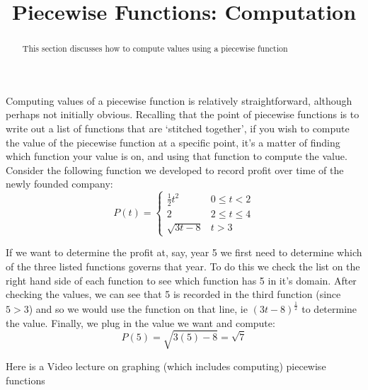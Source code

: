 \documentclass{ximera}
\title{Piecewise Functions: Computation}
\begin{document}
\begin{abstract}
    This section discusses how to compute values using a piecewise function
\end{abstract}
\maketitle


Computing values of a piecewise function is relatively straightforward, although perhaps not initially obvious. Recalling that the point of piecewise functions is to write out a list of functions that are `stitched together', if you wish to compute the value of the piecewise function at a specific point, it's a matter of finding which function your value is on, and using that function to compute the value. Consider the following function we developed to record profit over time of the newly founded company:
\[
    P(t) =
        \begin{cases}
            {\frac{1}{2}t^2} & 0\leq t < 2 \\
            {2} & 2 \leq t \leq 4 \\
            \sqrt{3t-8} & t > 3
        \end{cases}
\]

If we want to determine the profit at, say, year 5 we first need to determine which of the three listed functions governs that year. To do this we check the list on the right hand side of each function to see which function has 5 in it's domain. After checking the values, we can see that 5 is recorded in the third function (since $5 > 3$) and so we would use the function on that line, ie $\left(3t-8\right)^{\frac{1}{2}}$ to determine the value. Finally, we plug in the value we want and compute:
\[
    P(5) = \sqrt{3(5)-8} = \sqrt{7}
\]


Here is a Video lecture on graphing (which includes computing) piecewise functions

\end{document}
